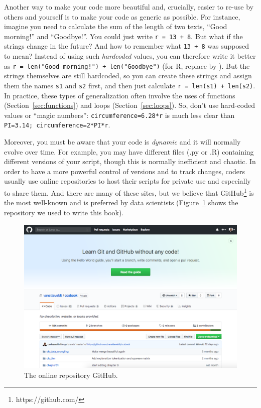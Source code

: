 Another way to make your code more beautiful and, crucially, easier to re-use by others and yourself is to make your code as generic as possible.
For instance, imagine you need to calculate the sum of the length of two texts, ``Good morning!'' and ``Goodbye!''.
You could just write \verb|r = 13 + 8|. But what if the strings change in the future? And how to remember what \verb|13 + 8| was supposed to mean?
Instead of using such \emph{hardcoded} values, you can therefore write it better as \verb|r = len("Good morning!") + len("Goodbye")| (for R, replace  by ).
But the strings themselves are still hardcoded, so you can  create these strings and assign them the names \verb|s1| and \verb|s2| first, and then just calculate \verb|r = len(s1) + len(s2)|. In practice, these types of generalization often involve the uses of functions (Section~\ref{sec:functions}) and loops (Section~\ref{sec:loops}). So, don't use hard-coded values or ``magic numbers'': \verb+circumference=6.28*r+ is much less clear than \verb+PI=3.14; circumference=2*PI*r+.

Moreover, you must be aware that your code is \textit{dynamic} and it will normally evolve over time. For example, you may have different files (.py or .R) containing different versions of your script, though this is normally inefficient and chaotic. In order to have a more powerful control of versions and to track changes, coders usually use online repositories to host their scripts for private use and especially to share them. And there are many of these sites, but we believe that GitHub\footnote{https://github.com/} is the most well-known and is preferred by data scientists (Figure~\ref{fig:github} shows the repository we used to write this book).

\begin{figure}
\centering
\includegraphics[width=0.9\linewidth]{figures/ch04_github.png}
\caption{The online repository GitHub.}
\label{fig:github}
\end{figure}

